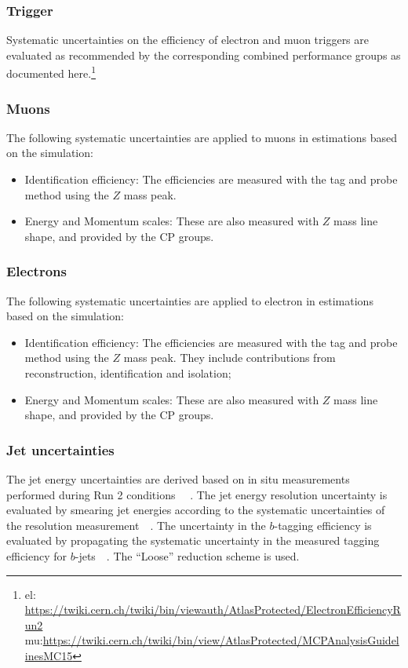 \subsubsection{Trigger}
Systematic uncertainties on the efficiency of electron and muon triggers are
evaluated as recommended by the corresponding combined performance groups as documented here.\footnote{el: \url{https://twiki.cern.ch/twiki/bin/viewauth/AtlasProtected/ElectronEfficiencyRun2} \\ mu:\url{https://twiki.cern.ch/twiki/bin/view/AtlasProtected/MCPAnalysisGuidelinesMC15}} 

\subsubsection{Muons}
The following systematic uncertainties are applied to muons in estimations based on the simulation:

\begin{itemize}
\item Identification efficiency: The efficiencies are measured with the tag and probe method using the $Z$ mass peak.
\item Energy and Momentum scales: These are also measured with $Z$ mass line shape, and provided by the CP groups. 
\end{itemize}

\subsubsection{Electrons}

The following systematic uncertainties are applied to electron in estimations based on the simulation:

\begin{itemize}
\item Identification efficiency: The efficiencies are measured with
  the tag and probe method using the $Z$ mass peak. They include
  contributions from reconstruction, identification and isolation;
\item Energy and Momentum scales: These are also measured with $Z$ mass line shape, and provided by the CP groups. 
\end{itemize}

\subsubsection{Jet uncertainties}
The jet energy uncertainties are derived based on in situ measurements
performed during Run 2 conditions ~~\cite{ATL-PHYS-PUB-2015-015}. The jet energy
resolution uncertainty is evaluated by smearing jet energies according
to the systematic uncertainties of the resolution
measurement~~\cite{Aad:2014bia}. The uncertainty in the $b$-tagging
efficiency is evaluated by propagating the systematic uncertainty in
the measured tagging efficiency for
$b$-jets~~\cite{ATLAS-CONF-2014-004}. The ``Loose'' reduction scheme
is used.


